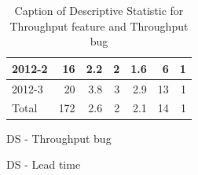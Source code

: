 \documentclass[UKenglish]{ifimaster}  %
\begin{document}
\begin{appendices}
\begin{table}[!htbp]
\begin{adjustwidth}{-2.5cm}{}
\begin{subfigure}[b]{0.3\textwidth}
{\begin{tabular}{ | l | r | r | r | r | r | r | }
 2012-2  & 16 & 2.2 & 2 & 1.6 & 6 & 1 \\ \hline
 2012-3  & 20 & 3.8 & 3 & 2.9 & 13 & 1 \\ \hline
 Total  & 172 & 2.6 & 2 & 2.1 & 14 & 1 \\ \hline
\end{tabular}
}
\caption{DS - Throughput bug}
 \label{DS:TPB:7}
\end{subfigure}
\end{adjustwidth}
\caption[Optional caption for list of figures]{Caption of Descriptive Statistic for Throughput feature and Throughput bug}
\label{DS:7:2}
\end{table}



\begin{table}[!htbp]
  \begin{adjustwidth}{-1.5cm}{}
\begin{subfigure}[b]{0.7\textwidth}
\caption{DS - Lead time}
 \label{DS:LT:7}
\end{subfigure}
\begin{subfigure}[b]{0.3\textwidth}
\end{subfigure}
\end{adjustwidth}
\end{table}
\end{appendices}
\end{document}
